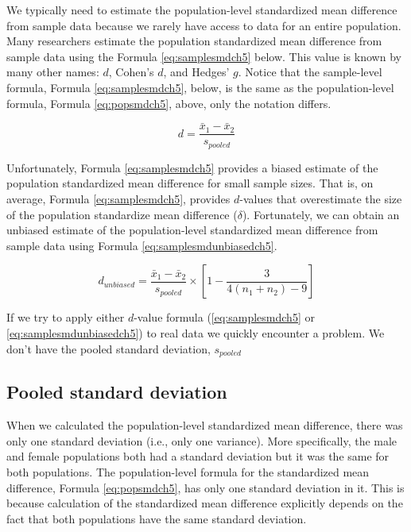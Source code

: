 \documentclass[
]{krantz}
\begin{document}
We typically need to estimate the population-level standardized mean difference from sample data because we rarely have access to data for an entire population. Many researchers estimate the population standardized mean difference from sample data using the Formula \eqref{eq:samplesmdch5} below. This value is known by many other names: \(d\), Cohen's \(d\), and Hedges' \(g\). Notice that the sample-level formula, Formula \eqref{eq:samplesmdch5}, below, is the same as the population-level formula, Formula \eqref{eq:popsmdch5}, above, only the notation differs.

\begin{equation} 
d  = \frac{\bar{x}_{1} - \bar{x}_{2}}{s_{pooled}} 
      \label{eq:samplesmdch5}
\end{equation}

Unfortunately, Formula \eqref{eq:samplesmdch5} provides a biased estimate of the population standardized mean difference for small sample sizes. That is, on average, Formula \eqref{eq:samplesmdch5}, provides \(d\)-values that overestimate the size of the population standardize mean difference (\(\delta\)). Fortunately, we can obtain an unbiased estimate of the population-level standardized mean difference from sample data using Formula \eqref{eq:samplesmdunbiasedch5}.

\begin{equation} 
d_{unbiased}  = \frac{\bar{x}_{1} - \bar{x}_{2}}{s_{pooled}} \times [1 - \frac{3}{4(n_1 + n_2)-9}]
      \label{eq:samplesmdunbiasedch5}
\end{equation}

If we try to apply either \(d\)-value formula (\eqref{eq:samplesmdch5} or \eqref{eq:samplesmdunbiasedch5}) to real data we quickly encounter a problem. We don't have the pooled standard deviation, \(s_{pooled}\)

\hypertarget{pooled-standard-deviation}{%
\subsection{Pooled standard deviation}\label{pooled-standard-deviation}}

When we calculated the population-level standardized mean difference, there was only one standard deviation (i.e., only one variance). More specifically, the male and female populations both had a standard deviation but it was the same for both populations. The population-level formula for the standardized mean difference, Formula \eqref{eq:popsmdch5}, has only one standard deviation in it. This is because calculation of the standardized mean difference explicitly depends on the fact that both populations have the same standard deviation.
\end{document}
